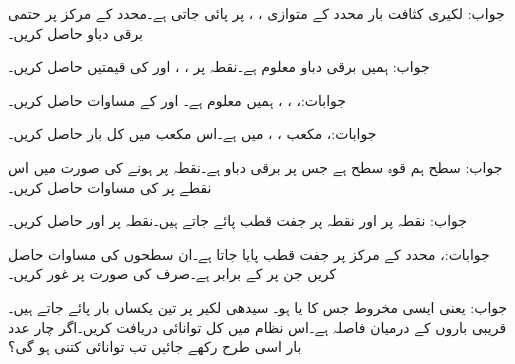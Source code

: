 جواب:
لکیری کثافت بار  محدد  کے متوازی ، ،  پر پائی جاتی ہے۔محدد کے مرکز پر حتمی برقی دباو حاصل کریں۔

جواب:
ہمیں برقی دباو  معلوم ہے۔نقطہ  پر ، ،  اور  کی قیمتیں حاصل کریں۔

جوابات:، ،
 ، 
ہمیں  معلوم ہے۔ اور  کے مساوات حاصل کریں۔

جوابات:، 
مکعب ، ،  میں  ہے۔اس مکعب میں کل بار حاصل کریں۔

جواب:
سطح  ہم قوہ سطح ہے جس پر برقی دباو  ہے۔نقطہ  پر  ہونے کی صورت میں اس نقطے پر  کی مساوات حاصل کریں۔

جواب: 
نقطہ  پر  اور نقطہ  پر  جفت قطب پائے جاتے ہیں۔نقطہ  پر  اور  حاصل کریں۔

جوابات:، 
محدد کے مرکز پر  جفت قطب پایا جاتا ہے۔ان سطحوں کی مساوات حاصل کریں جن پر  کے برابر ہے۔صرف  کی صورت پر غور کریں۔

جواب: یعنی ایسی مخروط جس کا  یا  ہو۔ 
سیدھی لکیر پر تین یکساں بار  پائے جاتے ہیں۔قریبی باروں کے درمیان فاصلہ  ہے۔اس نظام میں کل توانائی دریافت کریں۔اگر چار عدد بار اسی طرح رکھے جائیں تب توانائی کتنی ہو گی؟

